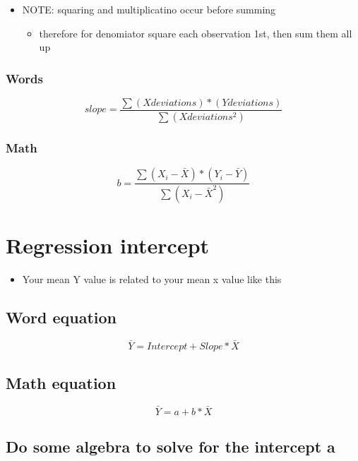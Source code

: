 \documentclass[
]{book}
\providecommand{\tightlist}{%
  \setlength{\itemsep}{0pt}\setlength{\parskip}{0pt}}
\begin{document}
\begin{itemize}
\tightlist
\item
  NOTE: squaring and multiplicatino occur before summing

  \begin{itemize}
  \tightlist
  \item
    therefore for denomiator square each observation 1st, then sum them all up
  \end{itemize}
\end{itemize}

\hypertarget{words}{%
\subsection{Words}\label{words}}

\[slope = \frac{\sum (X deviations)*(Y deviations)}{\sum (X  deviations^2)} \]

\hypertarget{math}{%
\subsection{Math}\label{math}}

\[b = \frac{\sum (X_i-\bar{X})*(Y_i-\bar{Y})}{\sum (X_i-\bar{X}^2)} \]

\hypertarget{regression-intercept}{%
\chapter{Regression intercept}\label{regression-intercept}}

\begin{itemize}
\tightlist
\item
  Your mean Y value is related to your mean x value like this
\end{itemize}

\hypertarget{word-equation}{%
\section{Word equation}\label{word-equation}}

\[\bar{Y} = Intercept + Slope*\bar{X} \]

\hypertarget{math-equation}{%
\section{Math equation}\label{math-equation}}

\[\bar{Y} = a + b*\bar{X} \]

\hypertarget{do-some-algebra-to-solve-for-the-intercept-a}{%
\section{Do some algebra to solve for the intercept a}\label{do-some-algebra-to-solve-for-the-intercept-a}}
\end{document}
